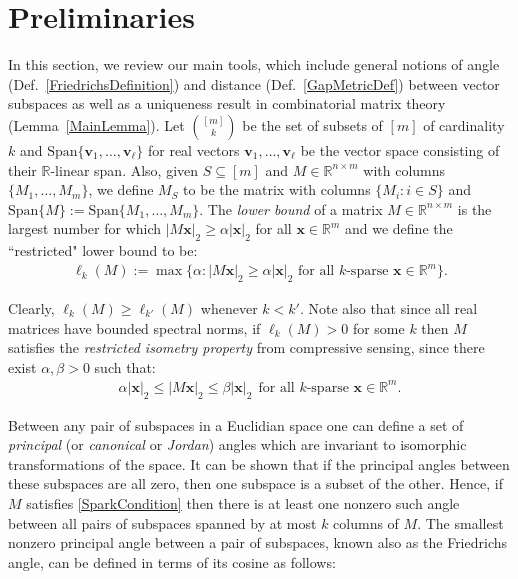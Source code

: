 \documentclass[journal, onecolumn]{IEEEtran}
\begin{document}
\section{Preliminaries}\label{Preliminaries}
In this section, we review our main tools, which include general notions of angle (Def.~\ref{FriedrichsDefinition}) and distance (Def.~\ref{GapMetricDef}) between vector subspaces as well as a uniqueness result in combinatorial matrix theory (Lemma~\ref{MainLemma}).
Let ${[m] \choose k}$ be the set of subsets of $[m]$ of cardinality $k$ and $\text{Span}\{\mathbf{v}_1, \ldots, \mathbf{v}_\ell\}$ for real vectors $\mathbf{v}_1, \ldots, \mathbf{v}_\ell$ be the vector space consisting of their $\mathbb{R}$-linear span.
%
%
Also, given $S \subseteq [m]$ and $M \in \mathbb{R}^{n \times m}$ with columns $\{M_1,\ldots,M_m\}$, we define $M_S$ to be the matrix with columns $\{M_i: i \in S\}$ and $\text{Span}\{M\} := \text{Span}\{M_1, \ldots, M_m\}$.  The \emph{lower bound} of a matrix $M \in \mathbb{R}^{n \times m}$ \cite{Grcar10} is the largest number for which $|M\mathbf{x}|_2 \geq \alpha|\mathbf{x}|_2$ for all $\mathbf{x} \in \mathbb{R}^m$ and we define the ``restricted" lower bound to be:
\begin{align}
\ell_k(M) := \max \{ \alpha : |M\mathbf{x}|_2 \geq \alpha|\mathbf{x}|_2 \text{ for all $k$-sparse } \mathbf{x} \in \mathbb{R}^m\}.
\end{align}

Clearly, $\ell_{k}(M) \geq \ell_{k'}(M)$ whenever $k < k'$. Note also that since all real matrices have bounded spectral norms, if $\ell_k(M) > 0$ for some $k$ then $M$ satisfies the \emph{restricted isometry property} \cite{CandesTao05} from compressive sensing, since there exist $\alpha, \beta > 0$ such that:
\begin{align}
\alpha|\mathbf{x}|_2 \leq |M\mathbf{x}|_2 \leq \beta|\mathbf{x}|_2 \ \ \text{for all $k$-sparse } \mathbf{x} \in \mathbb{R}^m.
\end{align}

Between any pair of subspaces in a Euclidian space one can define a set of \textit{principal} (or \textit{canonical} or \textit{Jordan}) angles which are invariant to isomorphic transformations of the space. It can be shown that if the principal angles between these subspaces are all zero, then one subspace is a subset of the other. Hence, if $M$ satisfies \eqref{SparkCondition} then there is at least one nonzero such angle between all pairs of subspaces spanned by at most $k$ columns of $M$. The smallest nonzero principal angle between a pair of subspaces, known also as the Friedrichs angle, can be defined in terms of its cosine as follows:
\end{document}
